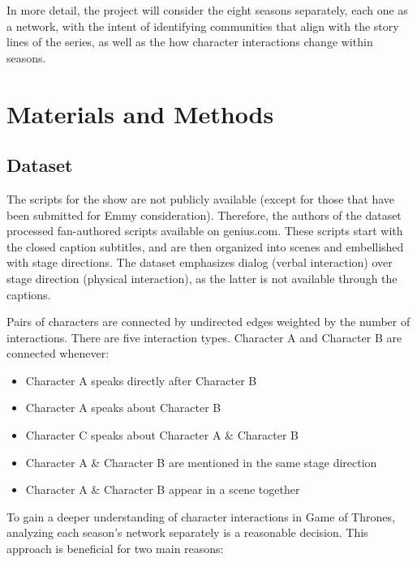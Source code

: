 \documentclass[10pt,twocolumn,letterpaper]{article}
\begin{document}
In more detail, the project will consider the eight seasons separately, each one as a network, with the intent of identifying communities that align with the story lines of the series, as well as the how character interactions change within seasons.

\section{Materials and Methods}

\subsection{Dataset}

The scripts for the show are not publicly available (except for those that have been submitted for Emmy consideration). Therefore, the authors of the dataset processed fan-authored scripts available on genius.com. These scripts start with the closed caption subtitles, and are then organized into scenes and embellished with stage directions. The dataset emphasizes dialog (verbal interaction) over stage direction (physical interaction), as the latter is not available through the captions. 

Pairs of characters are connected by undirected edges weighted by the number of interactions. There are five interaction types. Character A and Character B are connected whenever:
\begin{itemize}
    \item Character A speaks directly after Character B
    \item Character A speaks about Character B
    \item Character C speaks about Character A \& Character B
    \item Character A \& Character B are mentioned in the same stage direction
    \item Character A \& Character B appear in a scene together
\end{itemize}


To gain a deeper understanding of character interactions in Game of Thrones, analyzing each season's network separately is a reasonable decision. This approach is beneficial for two main reasons:
\end{document}
